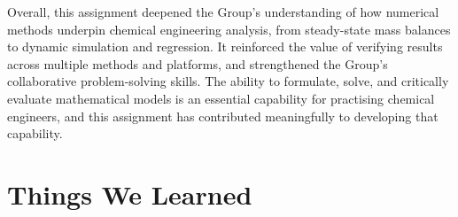 \documentclass[12pt,a4paper]{article}
\begin{document}
Overall, this assignment deepened the Group's understanding of how numerical methods
underpin chemical engineering analysis, from steady-state mass balances to dynamic
simulation and regression. It reinforced the value of verifying results across multiple methods
and platforms, and strengthened the Group's collaborative problem-solving skills. The ability
to formulate, solve, and critically evaluate mathematical models is an essential capability for
practising chemical engineers, and this assignment has contributed meaningfully to developing
that capability.

\section*{Things We Learned}
\end{document}
